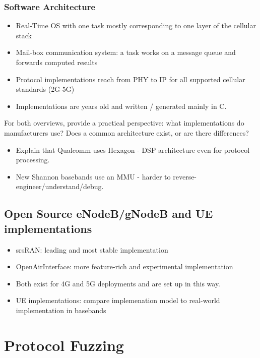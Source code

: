 \documentclass[a4paper,11pt,oneside]{report}
\begin{document}
\subsubsection{Software Architecture}
\begin{itemize}
  \item Real-Time OS with one task mostly corresponding to one layer of the cellular stack
  \item Mail-box communication system: a task works on a message queue and forwards computed results
  \item Protocol implementations reach from PHY to IP for all supported cellular standards (2G-5G)
  \item Implementations are years old and written / generated mainly in C.
\end{itemize}

For both overviews, provide a practical perspective: what implementations do manufacturers use?
Does a common architecture exist, or are there differences?
\begin{itemize}
  \item Explain that Qualcomm uses Hexagon - DSP architecture even for protocol processing.
  \item New Shannon basebands use an MMU - harder to reverse-engineer/understand/debug.
\end{itemize}


\subsection{Open Source eNodeB/gNodeB and UE implementations}

\begin{itemize}
  \item srsRAN: leading and most stable implementation
  \item OpenAirInterface: more feature-rich and experimental implementation
  \item Both exist for 4G and 5G deployments and are set up in this way.
  \item UE implementations: compare implemenation model to real-world implementation in basebands 
\end{itemize}


\section{Protocol Fuzzing}
\end{document}

